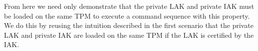\documentclass[runningheads]{llncs}
\begin{document}


From here we need only demonstrate that the private LAK and private
IAK must be loaded on the same TPM to execute a command sequence with
this property.  We do this by reusing the intuition described in the
first scenario that the private LAK and private IAK are loaded on the
same TPM if the LAK is certified by the IAK.
\end{document}
